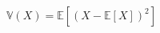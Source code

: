\documentclass[preview]{standalone}
\begin{document}
\begin{align*}
\mathbb{V}(X) = \mathbb{E}\left[(X - \mathbb{E}[X])^2\right]
\end{align*}
\end{document}
